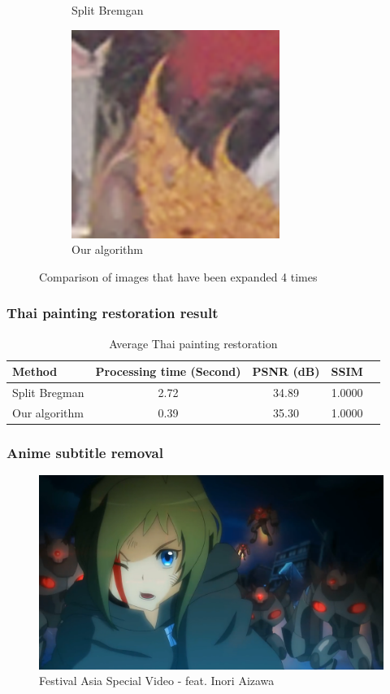 \documentclass[xcolor=dvipsnames, xetex,serif]{beamer}
\begin{document}
\begin{frame}
\begin{figure}[H]
\begin{subfigure}{0.4\linewidth}
                \caption{Split Bremgan}
            \end{subfigure}
            \begin{subfigure}{0.4\linewidth}
                \centering
                \includegraphics[width=0.6\linewidth]{images/result_ex4_scaleup/multisplitbregman.png}	
                \caption{Our algorithm}
            \end{subfigure}
            \caption{Comparison of images that have been expanded 4 times}
        \end{figure}
    \end{frame}
    \begin{frame}
        \frametitle{Thai painting restoration result}        \begin{table}[H]
            \centering
            \begin{tabular}[ht]{|l|c|c|c|c|}
                \hline
                Method  & Processing time  (Second) & PSNR (dB) & SSIM \\
                \hline
                Split Bregman & 2.72 & 34.89 & 1.0000 \\ 
                Our algorithm & 0.39 & 35.30 & 1.0000 \\
                \hline
            \end{tabular}
            \caption{Average Thai painting restoration}
        \end{table}	
    \end{frame}
    \begin{frame}
        \frametitle{Anime subtitle removal}
        \begin{figure}[H]
            \centering
            \includegraphics[width=0.8\linewidth]{images/inori-preview.png}
            \caption{ Festival Asia Special Video - feat. Inori Aizawa }
        \end{figure}
    \end{frame}
\end{document}
